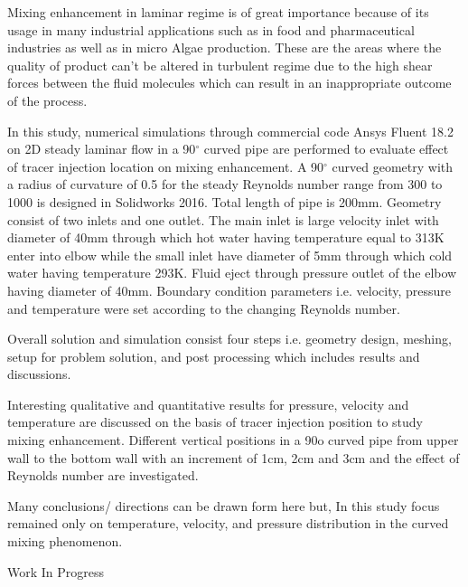{\normalsize
Mixing enhancement in laminar regime is of great importance because of its usage in many industrial applications such as in food and pharmaceutical industries as well as in micro Algae production. These are the areas where the quality of product can't be altered in turbulent regime due to the high shear forces between the fluid molecules which can result in an inappropriate outcome of the process. 

In this study, numerical simulations through commercial code Ansys Fluent 18.2 on 2D steady laminar flow in a 90$^{\circ}$ curved pipe are performed to evaluate effect of tracer injection location on mixing enhancement. A 90$^{\circ}$ curved geometry with a radius of curvature of 0.5 for the steady Reynolds number range from 300 to 1000 is designed in Solidworks 2016. Total length of pipe is 200mm. Geometry consist of two inlets and one outlet. The main inlet is large velocity inlet with diameter of 40mm through which hot water having temperature equal to 313K enter into elbow while the small inlet have diameter of 5mm through which cold water having temperature 293K. Fluid eject through pressure outlet of the elbow having diameter of 40mm. Boundary condition parameters i.e. velocity, pressure and temperature were set according to the changing Reynolds number. 


Overall solution and simulation consist four steps i.e. geometry design, meshing, setup for problem solution, and post processing which includes results and discussions. 



Interesting qualitative and quantitative results for pressure, velocity and temperature are discussed on the basis of tracer injection position to study mixing enhancement. Different vertical positions in a 90o curved pipe  from upper wall to the bottom wall with an increment of 1cm, 2cm and 3cm and the effect of Reynolds number are investigated.  







Many conclusions/ directions can be drawn form here but, In this study focus remained only on temperature, velocity, and pressure distribution in the curved mixing phenomenon.

 \vfill Work In Progress

}
 
